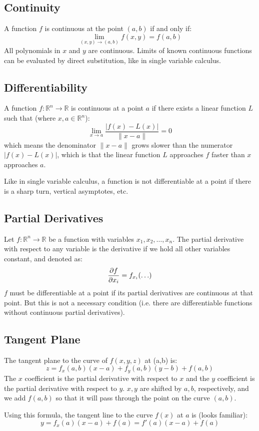 \documentclass{article}
\begin{document}
\subsection{Continuity}

A function $f$ is continuous at the point $(a,b)$ if and only if:
\begin{equation*}
    \lim_{(x,y)\to(a,b)}f(x,y)=f(a,b)
\end{equation*}
All polynomials in $x$ and $y$ are continuous. Limits of known continuous functions can be evaluated by direct substitution, like in single variable calculus.

\subsection{Differentiability}

A function $f:\mathbb R^n\to\mathbb R$ is continuous at a point $a$ if there exists a linear function $L$ such that (where $x,a\in\mathbb R^n$):
\begin{equation*}
    \lim_{x\to a}\frac{\left|f(x)-L(x)\right|}{\lVert x-a \rVert }=0
\end{equation*}
which means the denominator $\lVert x-a \rVert $ grows slower than the numerator $\left|f(x)-L(x)\right|$, which is that the linear function $L$ approaches $f$ faster than $x$ approaches $a$.

Like in single variable calculus, a function is not differentiable at a point if there is a sharp turn, vertical asymptotes, etc.

\subsection{Partial Derivatives}

Let $f:\mathbb R^n\to\mathbb R$ be a function with variables $x_1,x_2,\ldots,x_n$. The partial derivative with respect to any variable is the derivative if we hold all other variables constant, and denoted as:
\begin{equation*}
	\diffp{f}{x_i}=f_{x_i}(\ldots)
\end{equation*}
$f$ must be differentiable at a point if its partial derivatives are continuous at that point. But this is not a necessary condition (i.e. there are differentiable functions without continuous partial derivatives).

\subsection{Tangent Plane}
The tangent plane to the curve of $f(x,y,z)$ at (a,b) is:
\begin{equation*}
    z=f_x(a,b)(x-a)+f_y(a,b)(y-b)+f(a,b)
\end{equation*}
The $x$ coefficient is the partial derivative with respect to $x$ and the $y$ coefficient is the partial derivative with respect to $y$. $x,y$ are shifted by $a,b$, respectively, and we add $f(a,b)$ so that it will pass through the point on the curve $(a,b)$.

Using this formula, the tangent line to the curve $f(x)$ at $a$ is (looks familiar):
\begin{equation*}
    y=f_x(a)(x-a)+f(a)
	=f'(a)(x-a)+f(a)
\end{equation*}
\end{document}
